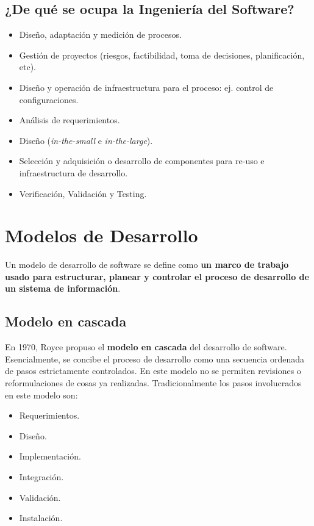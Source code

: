 \documentclass[]{article}
\begin{document}
\subsection{¿De qué se ocupa la Ingeniería del Software?}
\begin{itemize}
	\item Diseño, adaptación y medición de procesos.
	\item Gestión de proyectos (riesgos, factibilidad, toma de decisiones, planificación, etc).
	\item Diseño y operación de infraestructura para el proceso: ej. control de configuraciones.
	\item Análisis de requerimientos.
	\item Diseño (\textit{in-the-small} e \textit{in-the-large}).
	\item Selección y adquisición o desarrollo de componentes para re-uso e infraestructura de desarrollo.
	\item Verificación, Validación y Testing.
\end{itemize}

\newpage

\section{Modelos de Desarrollo}

Un modelo de desarrollo de software se define como \textbf{un marco de trabajo usado para estructurar, planear y controlar el proceso de desarrollo de un sistema de información}.

\subsection{Modelo en cascada}

En 1970, Royce propuso el \textbf{modelo en cascada} del desarrollo de software. Esencialmente, se concibe el proceso de desarrollo como una secuencia ordenada de pasos estrictamente controlados. En este modelo no se permiten revisiones o reformulaciones de cosas ya realizadas. Tradicionalmente los pasos involucrados en este modelo son:
\begin{itemize}
	\item Requerimientos.
	\item Diseño.
	\item Implementación.
	\item Integración.
	\item Validación.
	\item Instalación.
\end{itemize}
\end{document}
